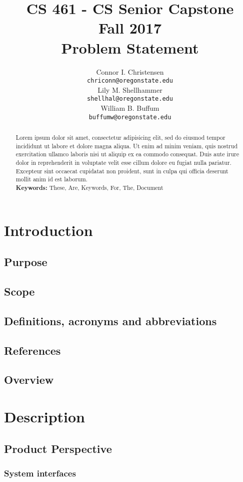 \documentclass[draftclsnofoot,onecolumn,letterpaper,10pt,compsoc]{IEEEtran}
\title{CS 461 - CS Senior Capstone
	\\Fall 2017
	\\Problem Statement
}
\author{
	Connor I. Christensen \\
	\texttt{chriconn@oregonstate.edu}
	\\
	Lily M. Shellhammer \\
	\texttt{shellhal@oregonstate.edu}
	\\
	William B. Buffum \\
	\texttt{buffumw@oregonstate.edu}
}
\begin{document}
\begin{titlingpage}
    \maketitle
    \begin{abstract}
			Lorem ipsum dolor sit amet, consectetur adipisicing elit, sed do eiusmod tempor incididunt ut labore et dolore magna aliqua. Ut enim ad minim veniam, quis nostrud exercitation ullamco laboris nisi ut aliquip ex ea commodo consequat. Duis aute irure dolor in reprehenderit in voluptate velit esse cillum dolore eu fugiat nulla pariatur. Excepteur sint occaecat cupidatat non proident, sunt in culpa qui officia deserunt mollit anim id est laborum.
			\\
			\textbf{Keywords:} These, Are, Keywords, For, The, Document
    \end{abstract}
		\pagebreak
		\tableofcontents
\end{titlingpage}

\section{Introduction}
	\subsection{Purpose}
	\subsection{Scope}
	\subsection{Definitions, acronyms and abbreviations}
	\subsection{References}
	\subsection{Overview}

\section{Description}
	\subsection{Product Perspective}
		\subsubsection{System interfaces}
\end{document}
